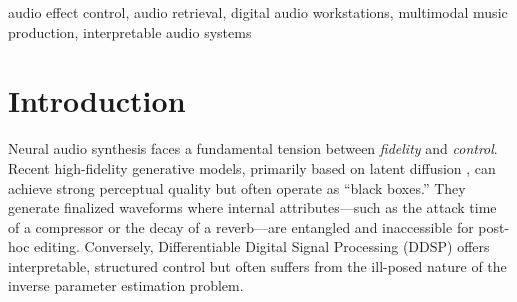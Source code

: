 \maketitle

\begin{abstract}
Digital audio workstations expose rich effect chains, yet a semantic gap remains between perceptual user intent and low-level signal-processing parameters. We study retrieval-grounded audio effect control, where the output is an editable plugin configuration rather than a finalized waveform. Our focus is Texture Resonance Retrieval (TRR), an audio representation built from Gram matrices of projected mid-level Wav2Vec2 activations to preserve texture-relevant co-activation structure. We evaluate TRR on a guitar-effects benchmark with 1,063 candidate presets and 204 queries under Protocol-A, including comparisons against PANNs, PaSST, CLAP, and an MLP direct-regression baseline, all evaluated with min-max normalized metrics grounded in physical DSP parameter ranges. Ablation studies validate TRR's core design choices: projection dimensionality, layer selection, and projection type. A near-duplicate sensitivity analysis confirms that results are robust to trivial knowledge-base matches. TRR achieves the lowest normalized parameter error among evaluated methods. A multiple-stimulus listening study with 26 participants provides complementary perceptual evidence. We interpret these results as benchmark evidence that texture-aware retrieval is useful for editable audio effect control, while broader personalization and real-audio robustness claims remain outside the verified evidence presented here.
\end{abstract}

\begin{IEEEkeywords}
audio effect control, audio retrieval, digital audio workstations, multimodal music production, interpretable audio systems
\end{IEEEkeywords}

\section{Introduction}
\label{sec:introduction}

	Neural audio synthesis faces a fundamental tension between \textit{fidelity} and \textit{control}. Recent high-fidelity generative models, primarily based on latent diffusion \citep{liu2023audioldm,agostinelli2023musiclm}, can achieve strong perceptual quality but often operate as ``black boxes.'' They generate finalized waveforms where internal attributes—such as the attack time of a compressor or the decay of a reverb—are entangled and inaccessible for post-hoc editing. Conversely, Differentiable Digital Signal Processing (DDSP) \citep{engel2020ddsp} offers interpretable, structured control but often suffers from the ill-posed nature of the inverse parameter estimation problem.

